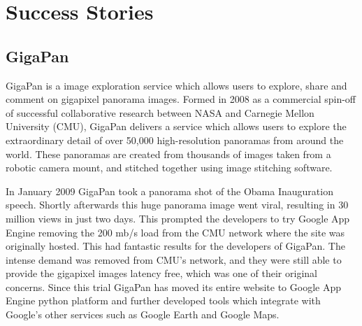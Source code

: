 \chapter{Success Stories}
\section{GigaPan}
GigaPan is a image exploration service which allows users to explore, share and comment on gigapixel panorama images. Formed in 2008 as a commercial spin-off of successful collaborative research between NASA and Carnegie Mellon University (CMU), GigaPan delivers a service which allows users to explore the extraordinary detail of over 50,000 high-resolution panoramas from around the world. These panoramas are created from thousands of images taken from a robotic camera mount, and stitched together using image stitching software\ftSgaeOne.

In January 2009 GigaPan took a panorama shot of the Obama Inauguration speech. Shortly afterwards this huge panorama image went viral, resulting in 30 million views in just two days. This prompted the developers to try Google App Engine removing the 200 mb/s load from the CMU network where the site was originally hosted. This had fantastic results for the developers of GigaPan. The intense demand was removed from CMU's network, and they were still able to provide the gigapixel images latency free, which was one of their original concerns\ftSgaeTwo. Since this trial GigaPan has moved its entire website to Google App Engine python platform and further developed tools which integrate with Google's other services such as Google Earth and Google Maps\ftSgaeThree.
